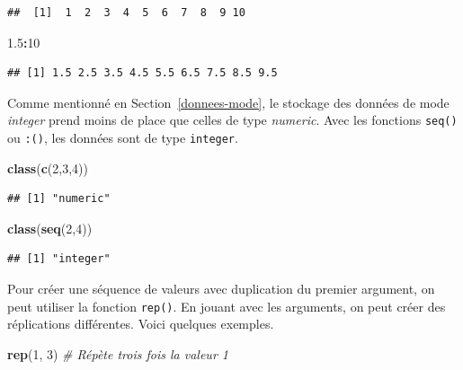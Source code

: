 \documentclass[
  11pt,
]{book}
\newenvironment{Shaded}{\begin{snugshade}}{\end{snugshade}}
\newcommand{\CommentTok}[1]{\textcolor[rgb]{0.56,0.35,0.01}{\textit{#1}}}
\newcommand{\DecValTok}[1]{\textcolor[rgb]{0.00,0.00,0.81}{#1}}
\newcommand{\FloatTok}[1]{\textcolor[rgb]{0.00,0.00,0.81}{#1}}
\newcommand{\KeywordTok}[1]{\textcolor[rgb]{0.13,0.29,0.53}{\textbf{#1}}}
\newcommand{\NormalTok}[1]{#1}
\newcommand{\OperatorTok}[1]{\textcolor[rgb]{0.81,0.36,0.00}{\textbf{#1}}}
\numberwithin{equation}{section}
\numberwithin{countremarque}{section}
\begin{document}
\begin{lstlisting}
##  [1]  1  2  3  4  5  6  7  8  9 10
\end{lstlisting}

\begin{Shaded}
\begin{Highlighting}[]
\FloatTok{1.5}\OperatorTok{:}\DecValTok{10}
\end{Highlighting}
\end{Shaded}

\begin{lstlisting}
## [1] 1.5 2.5 3.5 4.5 5.5 6.5 7.5 8.5 9.5
\end{lstlisting}

Comme mentionné en Section~\ref{donnees-mode}, le stockage des données de mode \emph{integer} prend moins de place que celles de type \emph{numeric}. Avec les fonctions \texttt{seq()} ou \texttt{:()}, les données sont de type \texttt{integer}.

\begin{Shaded}
\begin{Highlighting}[]
\KeywordTok{class}\NormalTok{(}\KeywordTok{c}\NormalTok{(}\DecValTok{2}\NormalTok{,}\DecValTok{3}\NormalTok{,}\DecValTok{4}\NormalTok{))}
\end{Highlighting}
\end{Shaded}

\begin{lstlisting}
## [1] "numeric"
\end{lstlisting}

\begin{Shaded}
\begin{Highlighting}[]
\KeywordTok{class}\NormalTok{(}\KeywordTok{seq}\NormalTok{(}\DecValTok{2}\NormalTok{,}\DecValTok{4}\NormalTok{))}
\end{Highlighting}
\end{Shaded}

\begin{lstlisting}
## [1] "integer"
\end{lstlisting}

Pour créer une séquence de valeurs avec duplication du premier argument, on peut utiliser la fonction \texttt{rep()}. En jouant avec les arguments, on peut créer des réplications différentes. Voici quelques exemples.

\begin{Shaded}
\begin{Highlighting}[]
\KeywordTok{rep}\NormalTok{(}\DecValTok{1}\NormalTok{, }\DecValTok{3}\NormalTok{) }\CommentTok{\# Répète trois fois la valeur 1}
\end{Highlighting}
\end{Shaded}
\end{document}
